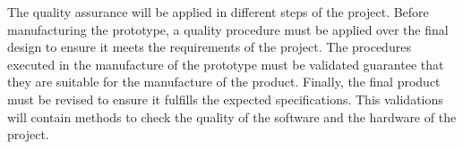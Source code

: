 The quality assurance will be applied in different steps of the project. Before manufacturing the prototype, a quality procedure must be applied over the final design to ensure it meets the requirements of the project. The procedures executed in the manufacture of the prototype must be validated guarantee that they are suitable for the manufacture of the product. Finally, the final product must be revised to ensure it fulfills the expected specifications. This validations will contain methods to check the quality of the software and the hardware of the project.
